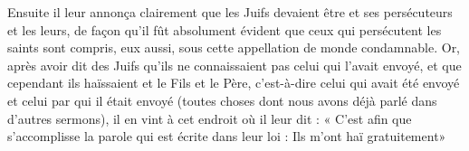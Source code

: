 Ensuite il leur annonça clairement que les Juifs devaient être et ses persécuteurs et les leurs, de façon qu’il fût absolument évident que ceux qui persécutent les saints sont compris, eux aussi, sous cette appellation de monde condamnable. Or, après avoir dit des Juifs qu’ils ne connaissaient pas celui qui l’avait envoyé, et que cependant ils haïssaient et le Fils et le Père, c’est-à-dire celui qui avait été envoyé et celui par qui il était envoyé (toutes choses dont nous avons déjà parlé dans d’autres sermons), il en vint à cet endroit où il leur dit : « C’est afin que s’accomplisse la parole qui est écrite dans leur loi : Ils m’ont haï gratuitement»